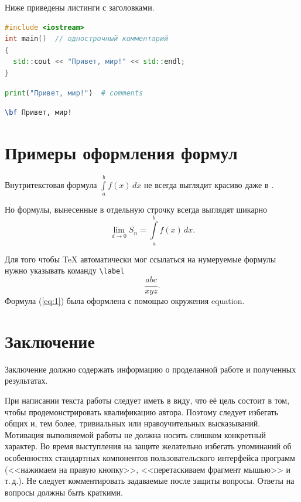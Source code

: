 \documentclass[14pt]{mmcs_article}
\begin{document}
Ниже приведены листинги с заголовками.

\begin{lstlisting}[language=C++, caption={C++, пример кода}, label=stud-lst:1]
#include <iostream>
int main()  // однострочный комментарий
{
  std::cout << "Привет, мир!" << std::endl;
}
\end{lstlisting}


\begin{lstlisting}[language=Python, caption={Python, пример кода}, label=stud-lst:2]
print("Привет, мир!")  # comments
\end{lstlisting}

\begin{lstlisting}[language=TeX, caption=\LaTeX, label=stud-lst:3]
% параметр language в наших листингах только для себя
\bf Привет, мир!
\end{lstlisting}



\newpage
\section{Примеры оформления формул}

Внутритекстовая формула
$ \int\limits_a^b f(x)\,dx$ не всегда выглядит красиво даже в \LaTeXe.

Но формулы, вынесенные в отдельную строчку всегда выглядят шикарно
\[
  \lim_{d\to 0} S_n =
  \int\limits_a^b f(x)\,dx.
\]

Для того чтобы {\TeX} автоматически мог ссылаться на нумеруемые формулы нужно указывать команду \verb"\label"
\begin{equation}\label{eq:1}
  \frac{abc}{xyz}.
\end{equation}
Формула (\ref{eq:1}) была оформлена с помощью окружения \textsf{equation}.

\newpage
{}
\section*{Заключение}

Заключение должно содержать информацию о проделанной работе и полученных результатах.

При написании текста работы следует иметь в виду, что её цель состоит в том, чтобы продемонстрировать квалификацию автора. Поэтому следует избегать общих и, тем более, тривиальных или нравоучительных высказываний. Мотивация выполняемой работы не должна носить слишком конкретный характер. Во время выступления на защите желательно избегать упоминаний об особенностях стандартных компонентов пользовательского интерфейса программ (<<нажимаем на правую кнопку>>, <<перетаскиваем фрагмент мышью>> и т.\,д.). Не следует комментировать задаваемые после защиты вопросы. Ответы на вопросы должны быть краткими.
\end{document}
